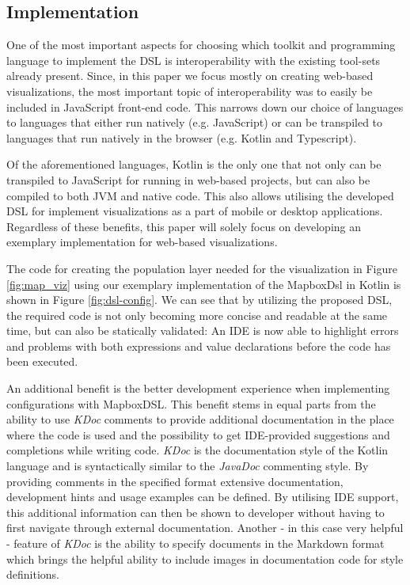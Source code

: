 \documentclass[conference]{IEEEtran}
\begin{document}
\subsection{Implementation}
One of the most important aspects for choosing which toolkit and programming language to implement the DSL is interoperability with the existing tool-sets already present. Since, in this paper we focus mostly on creating web-based visualizations, the most important topic of interoperability was to easily be included in JavaScript front-end code. This narrows down our choice of languages to languages that either run natively (e.g. JavaScript) or can be transpiled to languages that run natively in the browser (e.g. Kotlin and Typescript).

Of the aforementioned languages, Kotlin is the only one that not only can be transpiled to JavaScript for running in web-based projects, but can also be compiled to both JVM and native code. This also allows utilising the developed DSL for implement visualizations as a part of mobile or desktop applications. Regardless of these benefits, this paper will solely focus on developing an exemplary implementation for web-based visualizations.

The code for creating the population layer needed for the visualization in Figure \ref{fig:map_viz} using our exemplary implementation of the MapboxDsl in Kotlin is shown in Figure \ref{fig:dsl-config}. We can see that by utilizing the proposed DSL, the required code is not only becoming more concise and readable at the same time, but can also be statically validated: An IDE is now able to highlight errors and problems with both expressions and value declarations before the code has been executed.

An additional benefit is the better development experience when implementing configurations with MapboxDSL. This benefit stems in equal parts from the ability to use \textit{KDoc} comments to provide additional documentation in the place where the code is used and the possibility to get IDE-provided suggestions and completions while writing code. \textit{KDoc} is the documentation style of the Kotlin language and is syntactically similar to the \textit{JavaDoc} commenting style. 
By providing comments in the specified format extensive documentation, development hints and usage examples can be defined. By utilising IDE support, this additional information can then be shown to developer without having to first navigate through external documentation. Another - in this case very helpful - feature of \textit{KDoc} is the ability to specify documents in the Markdown format which brings the helpful ability to include images in documentation code for  style definitions.
\end{document}

